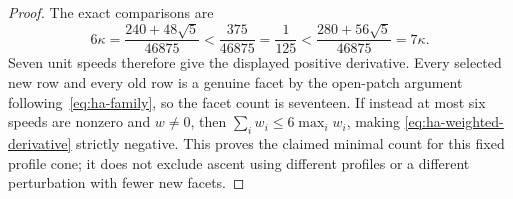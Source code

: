 \begin{proof}
The exact comparisons are
\[
 6\kappa=\frac{240+48\sqrt5}{46875}
   <\frac{375}{46875}=\frac1{125}
   <\frac{280+56\sqrt5}{46875}=7\kappa.
\]
Seven unit speeds therefore give the displayed positive derivative. Every
selected new row and every old row is a genuine facet by the open-patch
argument following~\eqref{eq:ha-family}, so the facet count is seventeen.
If instead at most six speeds are nonzero and $w\ne0$, then
$\sum_iw_i\leq6\max_iw_i$, making
\eqref{eq:ha-weighted-derivative} strictly negative. This proves the claimed
minimal count for this fixed profile cone; it does not exclude ascent using
different profiles or a different perturbation with fewer new facets.
\end{proof}
